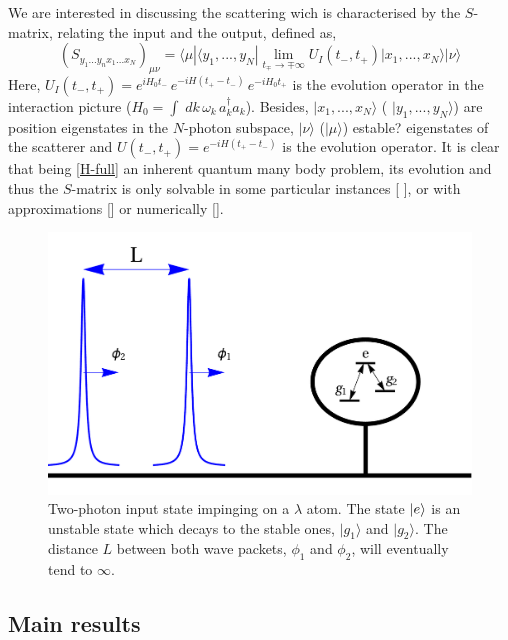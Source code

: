 \documentclass[notitlepage, prx, preprint, amsmath,superscriptaddress,amssymb]{revtex4-1}
\begin{document}
We are interested in discussing the scattering wich is characterised by the $S$-matrix, relating the input and the output, defined as,
\begin{equation}
\label{Sdef}
( S_{y_1 ...y_n x_1...x_N} )_{\mu \nu} = \langle \mu | \langle y_1, ..., y_N | \lim_{t_\mp  \to \mp \infty} U_I(t_-, t_+) | x_1, ..., x_N \rangle | \nu \rangle
\end{equation}
Here,  $U_I(t_-, t_+)= e^{i H_0 t_-} \,  e^{-i H (t_+- t_-)}  \,  e^{-i H_0 t_+}$ is the evolution operator  in the interaction picture ($H_0=  \int \; d k  \, \omega_k \, a_k^\dagger a_k $).
Besides, $|x_1, ...,x_N\rangle$ ( $|y_1, ...,y_N\rangle$)  are  position eigenstates in the $N$-photon subspace,  $|\nu \rangle$  ($|\mu\rangle$) {\color{blue} estable?} eigenstates of the scatterer and $U (t_-, t_+) = e^{-i H (t_+-t_-)}$ is the evolution operator.  
It is clear that being \eqref{H-full} an inherent quantum many body problem, its evolution and thus the $S$-matrix is only solvable in some particular instances [ ], or with  approximations [] or numerically [].    

  
\begin{figure}
\includegraphics[scale=0.25]{input.pdf}
\caption{Two-photon input state impinging on a $\lambda$ atom. The state $\ket{e}$ is an unstable state which decays to the stable ones, $|g_1\rangle$ and $|g_2\rangle$. The distance $L$ between both wave packets, $\phi_1$ and $\phi_2$, will eventually tend to $\infty$.}
\label{fig:input}
\end{figure}





\subsection{Main results}
\end{document}

